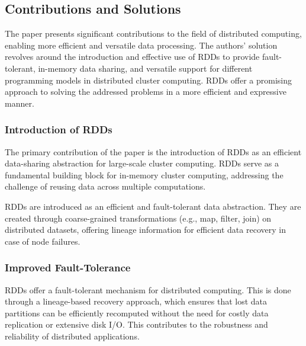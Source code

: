 \documentclass[10pt]{proc}
\begin{document}
\subsection{Contributions and Solutions}

The paper presents significant contributions to the field of distributed computing, enabling more efficient and versatile data processing. The authors' solution revolves around the introduction and effective use of RDDs to provide fault-tolerant, in-memory data sharing, and versatile support for different programming models in distributed cluster computing. RDDs offer a promising approach to solving the addressed problems in a more efficient and expressive manner.

\subsubsection{Introduction of RDDs} 
The primary contribution of the paper is the introduction of RDDs as an efficient data-sharing abstraction for large-scale cluster computing. RDDs serve as a fundamental building block for in-memory cluster computing, addressing the challenge of reusing data across multiple computations.

RDDs are introduced as an efficient and fault-tolerant data abstraction. They are created through coarse-grained transformations (e.g., map, filter, join) on distributed datasets, offering lineage information for efficient data recovery in case of node failures.
    
\subsubsection{Improved Fault-Tolerance}
RDDs offer a fault-tolerant mechanism for distributed computing. This is done through a lineage-based recovery approach, which ensures that lost data partitions can be efficiently recomputed without the need for costly data replication or extensive disk I/O. This contributes to the robustness and reliability of distributed applications.
\end{document}
